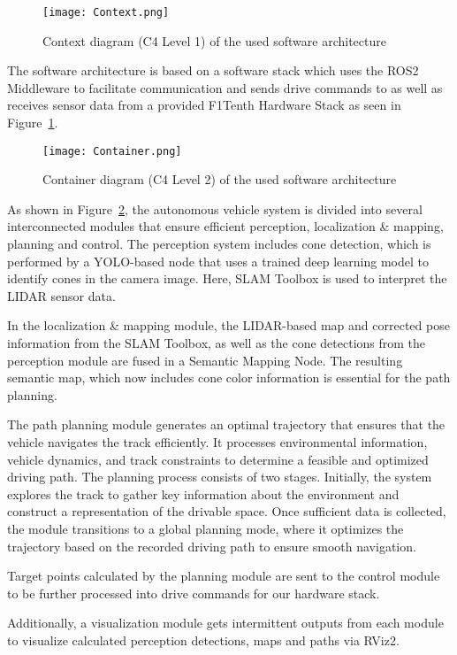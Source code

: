 \begin{figure}[H]
\begin{center}
\centerline{\texttt{[image: Context.png]}}
\caption{Context diagram (C4 Level 1) of the used software architecture}
\label{fig:arch-context}
\end{center}
\end{figure}
The software architecture is based on a software stack which uses the ROS2 Middleware to facilitate communication and sends drive commands to as well as receives sensor data from a provided F1Tenth Hardware Stack as seen in Figure~\ref{fig:arch-context}.
\begin{figure}[H]
\begin{center}
\centerline{\texttt{[image: Container.png]}}
\caption{Container diagram (C4 Level 2) of the used software architecture}
\label{fig:arch-container}
\end{center}
\end{figure}
As shown in Figure~\ref{fig:arch-container}, the autonomous vehicle system is divided into several interconnected modules that ensure efficient perception, localization \& mapping, planning and control. 
The perception system includes cone detection, which is performed by a YOLO-based node that uses a trained deep learning model to identify cones in the camera image.
Here, SLAM Toolbox is used to interpret the LIDAR sensor data.
\newline

In the localization \& mapping module, the LIDAR-based map and corrected pose information from the SLAM Toolbox, as well as the cone detections from the perception module are fused in a Semantic Mapping Node. The resulting semantic map, which now includes cone color information is essential for the path planning. 
\newline

The path planning module generates an optimal trajectory that ensures that the vehicle navigates the track efficiently. It processes environmental information, vehicle dynamics, and track constraints to determine a feasible and optimized driving path.
The planning process consists of two stages. Initially, the system explores the track to gather key information about the environment and construct a representation of the drivable space. Once sufficient data is collected, the module transitions to a global planning mode, where it optimizes the trajectory based on the recorded driving path to ensure smooth navigation.
\newline

Target points calculated by the planning module are sent to the control module to be further processed into drive commands for our hardware stack.
\newline

Additionally, a visualization module gets intermittent outputs from each module to visualize calculated perception detections, maps and paths via RViz2.\\